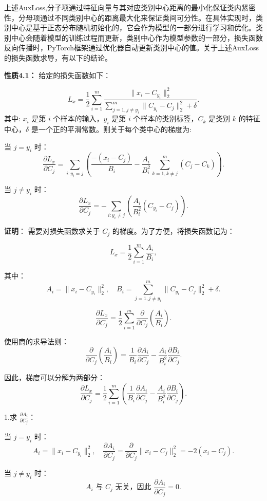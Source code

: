 上述AuxLoss,分子项通过特征向量与其对应类别中心距离的最小化保证类内紧密性，分母项通过不同类别中心的距离最大化来保证类间可分性。在具体实现时，类别中心是基于正态分布随机初始化的，它会作为模型的一部分进行学习和优化。类别中心会随着模型的训练过程而更新，类别中心作为模型参数的一部分，损失函数反向传播时，PyTorch框架通过优化器自动更新类别中心的值。关于上述AuxLoss的损失函数求导，有以下的结论。

\textbf{性质4.1：}
给定的损失函数如下：

\[
L_x = \frac{1}{2} \sum_{i=1}^m \frac{\|x_i - C_{y_i}\|_2^2}{\sum_{j=1, j \neq y_i}^{m} \|C_{y_i} - C_j\|_2^2 + \delta}.
\]
其中:
\( x_i \) 是第 \( i \) 个样本的输入，\( y_i \) 是第 \( i \) 个样本的类别标签，\( C_k \) 是类别 \( k \) 的特征中心，\( \delta \) 是一个正的平滑常数。则关于每个类中心的梯度为:


当 \( j = y_i \) 时：
\[
\frac{\partial L_x}{\partial C_j} =  \sum_{i: y_i = j} \left( \frac{- (x_i - C_j)}{B_i} - \frac{A_i}{B_i^2} \sum_{k=1, k \neq j}^m  (C_j - C_k) \right).
\]

当 \( j \neq y_i \) 时：
\[
\frac{\partial L_x}{\partial C_j} = -\sum_{i: y_i \neq j} \left( \frac{A_i}{B_i^2} (C_{y_i} - C_j) \right).
\]


\textbf{证明}：
需要对损失函数求关于 \( C_j \) 的梯度。为了方便，将损失函数记为：

\[
L_x = \frac{1}{2} \sum_{i=1}^m \frac{A_i}{B_i},
\]

其中：
\[
A_i = \|x_i - C_{y_i}\|_2^2, \quad B_i = \sum_{j=1, j \neq y_i}^m \|C_{y_i} - C_j\|_2^2 + \delta.
\]

\[
\frac{\partial L_x}{\partial C_j} = \frac{1}{2} \sum_{i=1}^m \frac{\partial}{\partial C_j} \left( \frac{A_i}{B_i} \right).
\]

使用商的求导法则：
\[
\frac{\partial}{\partial C_j} \left( \frac{A_i}{B_i} \right) = \frac{1}{B_i} \frac{\partial A_i}{\partial C_j} - \frac{A_i}{B_i^2} \frac{\partial B_i}{\partial C_j}.
\]

因此，梯度可以分解为两部分：
\[
\frac{\partial L_x}{\partial C_j} = \frac{1}{2} \sum_{i=1}^m \left( \frac{1}{B_i} \frac{\partial A_i}{\partial C_j} - \frac{A_i}{B_i^2} \frac{\partial B_i}{\partial C_j} \right).
\]

1.求 \( \frac{\partial A_i}{\partial C_j} \)：

当 \( j = y_i \) 时：
\[
A_i = \|x_i - C_{y_i}\|_2^2, \quad \frac{\partial A_i}{\partial C_j} = \frac{\partial}{\partial C_j} \|x_i - C_j\|_2^2 = -2 (x_i - C_j).
\]

当 \( j \neq y_i \) 时：
\[
A_i \text{ 与 } C_j \text{ 无关，因此 } \frac{\partial A_i}{\partial C_j} = 0.
\]

